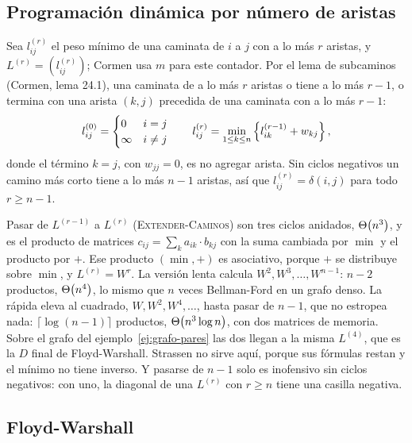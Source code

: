\documentclass[11pt,letterpaper]{article}
\begin{document}

\subsection*{Programación dinámica por número de aristas}

Sea $l^{(r)}_{ij}$ el peso mínimo de una caminata de $i$ a $j$ con a
lo más $r$ aristas, y $L^{(r)} = (l^{(r)}_{ij})$; Cormen usa $m$ para
este contador. Por el lema de subcaminos (Cormen, lema 24.1), una
caminata de a lo más $r$ aristas o tiene a lo más $r - 1$, o termina
con una arista $(k, j)$ precedida de una caminata con a lo más
$r - 1$:
\[
  l^{(0)}_{ij} = \begin{cases} 0 & i = j \\ \infty & i \neq j
  \end{cases}
  \qquad
  l^{(r)}_{ij} = \min_{1 \le k \le n} \left\{ l^{(r-1)}_{ik} + w_{kj} \right\} ,
\]
donde el término $k = j$, con $w_{jj} = 0$, es no agregar arista. Sin
ciclos negativos un camino más corto tiene a lo más $n - 1$ aristas,
así que $l^{(r)}_{ij} = \delta(i, j)$ para todo $r \ge n - 1$.

Pasar de $L^{(r-1)}$ a $L^{(r)}$ (\textsc{Extender-Caminos}) son tres
ciclos anidados, $\Theta\!\left(n^3\right)$, y es el producto de
matrices $c_{ij} = \sum_k a_{ik} \cdot b_{kj}$ con la suma cambiada
por $\min$ y el producto por $+$. Ese producto $(\min, +)$ es
asociativo, porque $+$ se distribuye sobre $\min$, y $L^{(r)} = W^r$.
La versión lenta calcula $W^2, W^3, \dots, W^{n-1}$: $n - 2$ productos,
$\Theta\!\left(n^4\right)$, lo mismo que $n$ veces Bellman-Ford en un grafo denso. La
rápida eleva al cuadrado, $W, W^2, W^4, \dots$, hasta pasar de
$n - 1$, que no estropea nada: $\lceil \log(n - 1) \rceil$ productos,
$\Theta\!\left(n^3 \log n\right)$, con dos matrices de memoria. Sobre el grafo del
ejemplo~\ref{ej:grafo-pares} las dos llegan a la misma $L^{(4)}$, que
es la $D$ final de Floyd-Warshall. Strassen no sirve aquí, porque sus
fórmulas restan y el mínimo no tiene inverso. Y pasarse de $n - 1$
solo es inofensivo sin ciclos negativos: con uno, la diagonal de una
$L^{(r)}$ con $r \ge n$ tiene una casilla negativa.


\subsection*{Floyd-Warshall}
\end{document}

